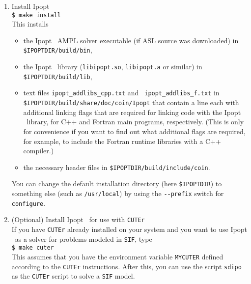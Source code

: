 \documentclass[10pt]{article}
\newcommand{\Ipopt}{{\sc Ipopt }}
\begin{document}
\begin{enumerate}
  Note: The {\tt configure} script is not able to automatically
  determine the C++ runtime libraries for the C++ compiler.  For
  certain compilers we enabled default values for this, but those
  might not exist or be wrong for your compiler.  In that case, the C
  and Fortran example in the test will most probably fail to compile.
  If you don't want to hook up the compiled \Ipopt\ library to some
  Fortran or C code that you wrote you don't need to worry about this.
  If you do want to link the \Ipopt\ library with a C or Fortran
  compiler, you need to find out the C++ runtime libraries (e.g., by
  running the C++ compiler in verbose mode for a simple example
  program) and run {\tt configure} again, and this time specify all
  C++ runtime libraries with the {\tt CXXLIBS} variable (see also
  Appendix~\ref{ExpertInstall}).
\item Install \Ipopt \\
  {\tt \$ make install}\\
  This installs
  \begin{itemize}
  \item the \Ipopt\ AMPL solver executable (if ASL source was
    downloaded) in \texttt{\$IPOPTDIR/build/bin},
  \item the \Ipopt\ library (\texttt{libipopt.so}, \texttt{libipopt.a}
    or similar) in \texttt{\$IPOPTDIR/build/lib},
  \item text files {\tt ipopt\_addlibs\_cpp.txt} and {\tt
      ipopt\_addlibs\_f.txt} in \texttt{\$IPOPTDIR/build/share/doc/coin/Ipopt} that contain a
    line each with additional linking flags that are required for
    linking code with the \Ipopt\ library, for C++ and Fortran main
    programs, respectively. (This is only for convenience if you want
    to find out what additional flags are required, for example, to
    include the Fortran runtime libraries with a C++ compiler.)
  \item the necessary header files in
    \texttt{\$IPOPTDIR/build/include/coin}.
  \end{itemize}
  You can change the default installation directory (here
  \texttt{\$IPOPTDIR}) to something else (such as \texttt{/usr/local})
  by using the \verb|--prefix| switch for \texttt{configure}.
\item (Optional) Install \Ipopt\ for use with {\tt CUTEr}\\
  If you have {\tt CUTEr} already installed on your system and you
  want to use \Ipopt\ as a solver for problems modeled in {\tt SIF},
  type\\
  {\tt \$ make cuter}\\
  This assumes that you have the environment variable {\tt MYCUTER}
  defined according to the {\tt CUTEr} instructions.  After this, you
  can use the script {\tt sdipo} as the {\tt CUTEr} script to solve a
  {\tt SIF} model.
\end{enumerate}
\end{document}
